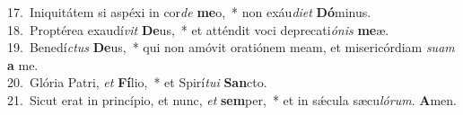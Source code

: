 {17.~}Iniquitátem si aspéxi in cor\textit{de} \textbf{me}o,~* non exáu\textit{di}\textit{et} \textbf{Dó}minus.\\
{18.~}Proptérea exaudí\textit{vit} \textbf{De}us,~* et atténdit voci deprecati\textit{ó}\textit{nis} \textbf{me}æ.\\
{19.~}Benedí\textit{ctus} \textbf{De}us,~* qui non amóvit oratiónem meam, et misericórdiam \textit{su}\textit{am} \textbf{a} me.\\
{20.~}Glória Patri, \textit{et} \textbf{Fí}lio,~* et Spirí\textit{tu}\textit{i} \textbf{San}cto.\\
{21.~}Sicut erat in princípio, et nunc, \textit{et} \textbf{sem}per,~* et in sǽcula sæcu\textit{ló}\textit{rum}. \textbf{A}men.\\
